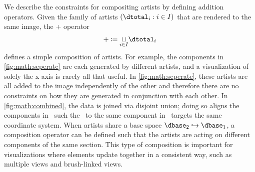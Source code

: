 \documentclass[../main.tex]{subfiles}
\begin{document}
We describe the constraints for compositing artists by defining addition operators. Given the family of artists $(\dtotal_i: i\in I)$ that are rendered to the same image, the + operator 
\begin{equation}
+ \coloneqq \underset{i\in I}{\sqcup} \dtotal_{i}
\end{equation}
defines a simple composition of artists. For example, the components in \autoref{fig:math:seperate} are each generated by different artists, and a visualization of solely the x axis is rarely all that useful. In \autoref{fig:math:seperate}, these artists are all added to the image independently of the other and therefore there are no constraints on how they are generated in conjunction with each other. In \autoref{fig:math:combined}, the data is joined via disjoint union; doing so aligns the components in \dfiber\ such the \vchannel\ to the same component in \vfiber\ targets the same coordinate system. When artists share a base space $\dbase_2 \hookrightarrow \dbase_1$, a composition operator can be defined such that the artists are acting on different components of the same section. This type of composition is important for visualizations where elements update together in a consistent way, such as multiple views \cite{alboRadarComparativeEvaluation2016a, hullmanKeeping2018} and brush-linked views\cite{beckerBrushingScatterplots1987,bujaInteractiveData1991}.
\end{document}
